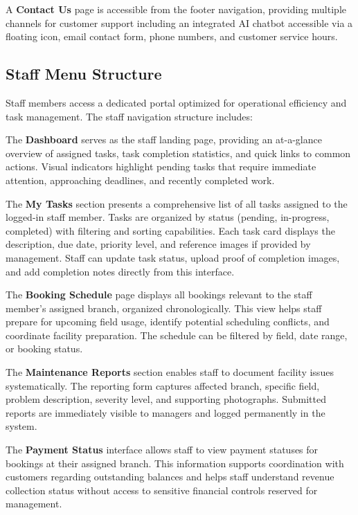 A \textbf{Contact Us} page is accessible from the footer navigation, providing multiple channels for customer support including an integrated AI chatbot accessible via a floating icon, email contact form, phone numbers, and customer service hours.

\subsection{Staff Menu Structure}

Staff members access a dedicated portal optimized for operational efficiency and task management. The staff navigation structure includes:

The \textbf{Dashboard} serves as the staff landing page, providing an at-a-glance overview of assigned tasks, task completion statistics, and quick links to common actions. Visual indicators highlight pending tasks that require immediate attention, approaching deadlines, and recently completed work.

The \textbf{My Tasks} section presents a comprehensive list of all tasks assigned to the logged-in staff member. Tasks are organized by status (pending, in-progress, completed) with filtering and sorting capabilities. Each task card displays the description, due date, priority level, and reference images if provided by management. Staff can update task status, upload proof of completion images, and add completion notes directly from this interface.

The \textbf{Booking Schedule} page displays all bookings relevant to the staff member's assigned branch, organized chronologically. This view helps staff prepare for upcoming field usage, identify potential scheduling conflicts, and coordinate facility preparation. The schedule can be filtered by field, date range, or booking status.

The \textbf{Maintenance Reports} section enables staff to document facility issues systematically. The reporting form captures affected branch, specific field, problem description, severity level, and supporting photographs. Submitted reports are immediately visible to managers and logged permanently in the system.

The \textbf{Payment Status} interface allows staff to view payment statuses for bookings at their assigned branch. This information supports coordination with customers regarding outstanding balances and helps staff understand revenue collection status without access to sensitive financial controls reserved for management.


